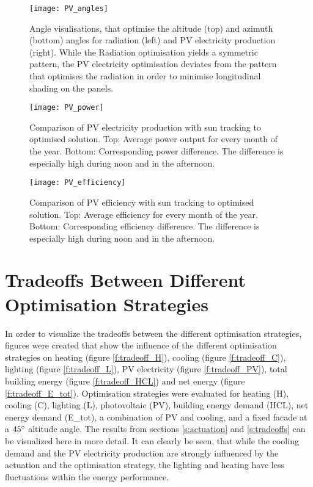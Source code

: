 	\begin{figure*}[hb]
		\begin{center}
		\texttt{[image: PV\_angles]}
		\caption{Angle visulisations, that optimise the altitude (top) and azimuth (bottom) angles for radiation (left) and PV electricity production (right). While the Radiation optimisation yields a symmetric pattern, the PV electricity optimisation deviates from the pattern that optimises the radiation in order to minimise longitudinal shading on the panels.}
		\label{f:PV_angles}
		\end{center}
	\end{figure*}

	\begin{figure*}
		\begin{center}
		\texttt{[image: PV\_power]}
		\caption{Comparison of PV electricity production with sun tracking to optimised solution. Top: Average power output for every month of the year. Bottom: Corresponding power difference. The difference is especially high during noon and in the afternoon.}
		\label{f:PV_power}
		\end{center}
	\end{figure*}

	\begin{figure*}
		\begin{center}
		\texttt{[image: PV\_efficiency]}
		\caption{Comparison of PV efficiency with sun tracking to optimised solution. Top: Average efficiency for every month of the year. Bottom: Corresponding efficiency difference. The difference is especially high during noon and in the afternoon.}
		\label{f:PV_efficiency}
		\end{center}
	\end{figure*}

	\cleardoublepage

\section{Tradeoffs Between Different Optimisation Strategies}
\label{a:tradeoffs}
	
	In order to visualize the tradeoffs between the different optimisation strategies, figures were created that show the influence of the different optimisation strategies on heating (figure \ref{f:tradeoff_H}), cooling (figure \ref{f:tradeoff_C}), lighting (figure \ref{f:tradeoff_L}), PV electricity (figure \ref{f:tradeoff_PV}), total building energy (figure \ref{f:tradeoff_HCL}) and net energy (figure \ref{f:tradeoff_E_tot}). Optimisation strategies were evaluated for heating (H), cooling (C), lighting (L), photovoltaic (PV), building energy demand (HCL), net energy demand (E\_tot), a combination of PV and cooling, and a fixed facade at a $45\degree$ altitude angle. The results from sections \ref{s:actuation} and \ref{s:tradeoffs} can be visualized here in more detail. It can clearly be seen, that while the cooling demand and the PV electricity production are strongly influenced by the actuation and the optimisation strategy, the lighting and heating have less fluctuations within the energy performance. 

